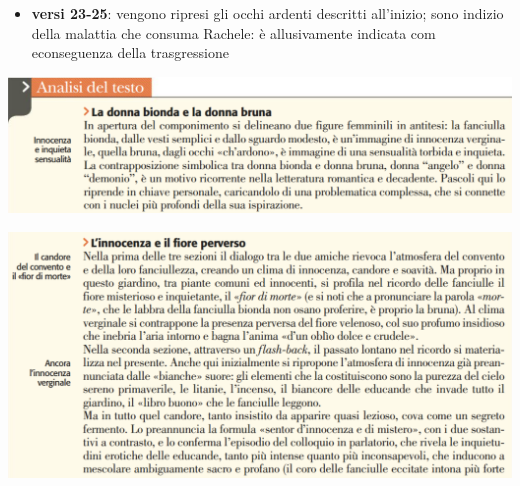 \documentclass[a4paper, twoside, titlepage]{book}
\newcommand{\elenco}[1]{%
\begin{itemize}
#1
\end{itemize}}
\begin{document}
\elenco{\item \textbf{versi 23-25}: vengono ripresi gli occhi ardenti descritti all'inizio; sono indizio della malattia che consuma Rachele: è allusivamente indicata com econseguenza della trasgressione}

\begin{center}
\includegraphics[width=\textwidth]{digitale1}
\end{center}

\begin{center}
\includegraphics[width=\textwidth]{digitale2}
\end{center}
\end{document}
